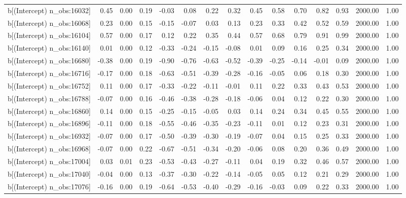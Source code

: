 \begin{table}[ht]
\begin{tabular}{rrrrrrrrrrrrrrr}
  b[(Intercept) n\_obs:16032] & 0.45 & 0.00 & 0.19 & -0.03 & 0.08 & 0.22 & 0.32 & 0.45 & 0.58 & 0.70 & 0.82 & 0.93 & 2000.00 & 1.00 \\ 
  b[(Intercept) n\_obs:16068] & 0.23 & 0.00 & 0.15 & -0.15 & -0.07 & 0.03 & 0.13 & 0.23 & 0.33 & 0.42 & 0.52 & 0.59 & 2000.00 & 1.00 \\ 
  b[(Intercept) n\_obs:16104] & 0.57 & 0.00 & 0.17 & 0.12 & 0.22 & 0.35 & 0.44 & 0.57 & 0.68 & 0.79 & 0.91 & 0.99 & 2000.00 & 1.00 \\ 
  b[(Intercept) n\_obs:16140] & 0.01 & 0.00 & 0.12 & -0.33 & -0.24 & -0.15 & -0.08 & 0.01 & 0.09 & 0.16 & 0.25 & 0.34 & 2000.00 & 1.00 \\ 
  b[(Intercept) n\_obs:16680] & -0.38 & 0.00 & 0.19 & -0.90 & -0.76 & -0.63 & -0.52 & -0.39 & -0.25 & -0.14 & -0.01 & 0.09 & 2000.00 & 1.00 \\ 
  b[(Intercept) n\_obs:16716] & -0.17 & 0.00 & 0.18 & -0.63 & -0.51 & -0.39 & -0.28 & -0.16 & -0.05 & 0.06 & 0.18 & 0.30 & 2000.00 & 1.00 \\ 
  b[(Intercept) n\_obs:16752] & 0.11 & 0.00 & 0.17 & -0.33 & -0.22 & -0.11 & -0.01 & 0.11 & 0.22 & 0.33 & 0.43 & 0.53 & 2000.00 & 1.00 \\ 
  b[(Intercept) n\_obs:16788] & -0.07 & 0.00 & 0.16 & -0.46 & -0.38 & -0.28 & -0.18 & -0.06 & 0.04 & 0.12 & 0.22 & 0.30 & 2000.00 & 1.00 \\ 
  b[(Intercept) n\_obs:16860] & 0.14 & 0.00 & 0.15 & -0.25 & -0.15 & -0.05 & 0.03 & 0.14 & 0.24 & 0.34 & 0.45 & 0.55 & 2000.00 & 1.00 \\ 
  b[(Intercept) n\_obs:16896] & -0.11 & 0.00 & 0.18 & -0.55 & -0.46 & -0.35 & -0.23 & -0.11 & 0.01 & 0.12 & 0.23 & 0.31 & 2000.00 & 1.00 \\ 
  b[(Intercept) n\_obs:16932] & -0.07 & 0.00 & 0.17 & -0.50 & -0.39 & -0.30 & -0.19 & -0.07 & 0.04 & 0.15 & 0.25 & 0.33 & 2000.00 & 1.00 \\ 
  b[(Intercept) n\_obs:16968] & -0.07 & 0.00 & 0.22 & -0.67 & -0.51 & -0.34 & -0.20 & -0.06 & 0.08 & 0.20 & 0.36 & 0.49 & 2000.00 & 1.00 \\ 
  b[(Intercept) n\_obs:17004] & 0.03 & 0.01 & 0.23 & -0.53 & -0.43 & -0.27 & -0.11 & 0.04 & 0.19 & 0.32 & 0.46 & 0.57 & 2000.00 & 1.00 \\ 
  b[(Intercept) n\_obs:17040] & -0.04 & 0.00 & 0.13 & -0.37 & -0.30 & -0.22 & -0.14 & -0.05 & 0.05 & 0.12 & 0.21 & 0.29 & 2000.00 & 1.00 \\ 
  b[(Intercept) n\_obs:17076] & -0.16 & 0.00 & 0.19 & -0.64 & -0.53 & -0.40 & -0.29 & -0.16 & -0.03 & 0.09 & 0.22 & 0.33 & 2000.00 & 1.00 \\ 

\end{tabular}
\end{table}
